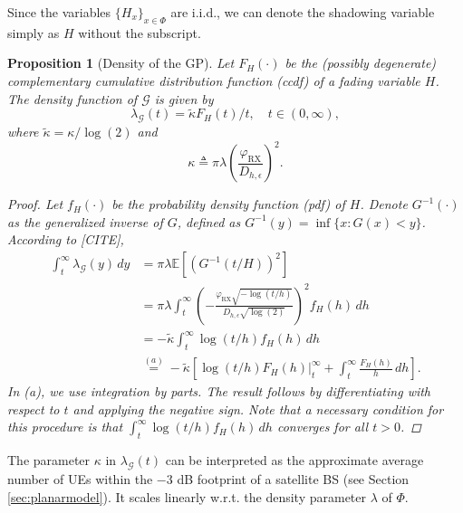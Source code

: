 \documentclass[lettersize,journal]{IEEEtran}
\newtheorem{prop}[theorem]{Proposition}
\begin{document}
Since the variables $\{H_x\}_{x \in \Phi}$ are i.i.d., we can denote the shadowing variable simply as $H$ without the subscript.
\begin{prop}[Density of the GP]
  Let $F_H(\cdot)$ be the (possibly degenerate) complementary cumulative distribution function (ccdf) of a fading variable $H$. The density function of $\mathcal{G}$ is given by
  \begin{equation}
    \label{eq:GPdensity}
    \lambda_{\mathcal{G}}(t) = \tilde{\kappa} {F_H(t)}/{t}, \quad t \in (0, \infty),
  \end{equation}
  where $\tilde{\kappa} = {\kappa}/{\log(2)}$ and
  \begin{equation}
    \label{eq:kappa}
    \kappa \triangleq \pi \lambda \left(\frac{\varphi_{\text{RX}}}{D_{h,\epsilon}}\right)^2.
  \end{equation}
  
  \begin{proof}
    Let $f_H(\cdot)$ be the probability density function (pdf) of $H$. Denote $G^{-1}(\cdot)$ as the generalized inverse of $G$, defined as $G^{-1}(y) = \inf \{x : G(x) < y\}$. According to [CITE],
    \begin{align*}
      \int_t^{\infty} \lambda_{\mathcal{G}}(y) \, dy &= \pi \lambda \mathbb{E}\left[ \left({G^{-1}(t/H)}{}\right)^2 \right] \\
      &= \pi \lambda \int_t^{\infty} \left(-\frac{\varphi_{\text{RX}} \sqrt{-\log(t/h)}}{D_{h,\epsilon} \sqrt{\log(2)}}\right)^2 f_H(h) \, dh \\
      &= -\tilde{\kappa} \int_t^{\infty} \log(t/h) f_H(h) \, dh \\
      &\overset{(a)}{=} -\tilde{\kappa} \left[ \left. \log(t/h) F_H(h) \right|_t^{\infty} + \int_t^{\infty} \frac{F_H(h)}{h} \, dh \right].
    \end{align*}
    In (a), we use integration by parts. The result follows by differentiating with respect to $t$ and applying the negative sign. Note that a necessary condition for this procedure is that $\int_t^{\infty} \log(t/h) f_H(h) \, dh$ converges for all $t > 0$.
  \end{proof}
\end{prop}

 

The parameter $\kappa$ in $\lambda_{\mathcal{G}}(t)$ can be interpreted as the approximate average number of UEs within the $-3$ dB footprint of a satellite BS (see Section \ref{sec:planarmodel}). It scales linearly w.r.t. the density parameter $\lambda$ of $\Phi$.
\end{document}
